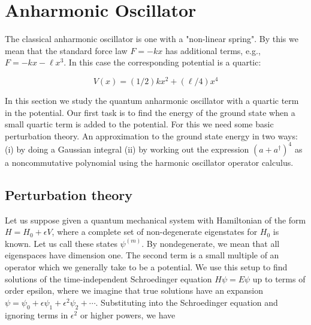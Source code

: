 
\begin{mathmacro}
\newcommand{\bra}[0]{\langle}
\newcommand{\ket}[0]{\rangle}
\newcommand{\WW}[0]{\mathbb{WW}}
\end{mathmacro}



\setcounter{section}{7}

\section{Anharmonic Oscillator}

\innertableofcontents

The classical anharmonic oscillator is one with a "non-linear spring". By this we mean that the standard force law $F = -kx$ has additional terms, e.g., $F = -kx - \ell x^3$.  In this case the corresponding potential is a quartic:

\begin{equation}
V(x) = (1/2)kx^2 + (\ell/4)x^4
\end{equation}

In this section we study the quantum anharmonic oscillator with a quartic term in the potential.  Our first task is to find the energy of the ground state when a small quartic term is added to the potential.  For this we need some basic perturbation theory.  An approximation to the ground state energy in two ways: (i) by doing a Gaussian integral (ii) by working out the expression $(a + a^\dagger)^4$ as a noncommutative polynomial using the harmonic oscillator operator calculus.

\subsection{Perturbation theory}

Let us suppose given a quantum mechanical system with Hamiltonian of the form $H = H_0 + \epsilon V$, where a complete set of non-degenerate eigenstates for $H_0$ is known.  Let us call these states $\psi^{(m)}$. By nondegenerate, we mean that all eigenspaces have dimension one. The second term is a small multiple of an operator which we generally take to be a potential.  We use this setup to                                         find solutions of the time-independent Schroedinger equation $H\psi = E\psi$ up to terms of order epsilon, where we imagine that true solutions have an expansion $\psi = \psi_0 + \epsilon \psi_1 + \epsilon^2 \psi_2 + \cdots$.  Substituting into the Schroedinger equation and ignoring terms in $\epsilon^2$ or higher powers, we have

